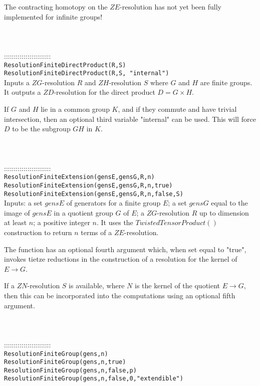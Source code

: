 \documentclass[a4paper,11pt]{report}
\begin{document}
{ The contracting homotopy on the $ZE$-resolution has not yet been fully implemented for infinite groups! \\
 \\
 \\
 \\
 ::::::::::::::::::::::::\\
 \texttt{ResolutionFiniteDirectProduct(R,S) }\\
 \texttt{ResolutionFiniteDirectProduct(R,S, "internal")}\\
 

 Inputs a $ZG$-resolution $R$ and $ZH$-resolution $S$ where $G$ and $H$ are finite groups. It outputs a $ZD$-resolution for the direct product $D=G{\ensuremath{\times}}H$.

 If $G$ and $H$ lie in a common group $K$, and if they commute and have trivial intersection, then an optional third
variable "internal" can be used. This will force $D$ to be the subgroup $GH$ in $K$. \\
 \\
 \\
 \\
 ::::::::::::::::::::::::\\
 \texttt{ResolutionFiniteExtension(gensE,gensG,R,n)}\\
 \texttt{ResolutionFiniteExtension(gensE,gensG,R,n,true) }\\
 \texttt{ResolutionFiniteExtension(gensE,gensG,R,n,false,S) }\\
 

 Inputs: a set $gensE$ of generators for a finite group $E$; a set $gensG$ equal to the image of $gensE$ in a quotient group $G$ of $E$; a $ZG$-resolution $R$ up to dimension at least $n$; a positive integer $n$. It uses the $TwistedTensorProduct()$ construction to return $n$ terms of a $ZE$-resolution.

 The function has an optional fourth argument which, when set equal to "true",
invokes tietze reductions in the construction of a resolution for the kernel
of $E \longrightarrow G$.

 If a $ZN$-resolution $S$ is available, where $N$ is the kernel of the quotient $E \longrightarrow G$, then this can be incorporated into the computations using an optional fifth
argument. \\
 \\
 \\
 \\
 ::::::::::::::::::::::::\\
 \texttt{ResolutionFiniteGroup(gens,n)}\\
 \texttt{ResolutionFiniteGroup(gens,n,true)}\\
 \texttt{ResolutionFiniteGroup(gens,n,false,p) }\\
 \texttt{ResolutionFiniteGroup(gens,n,false,0,"extendible") }\\
 

}
\end{document}
